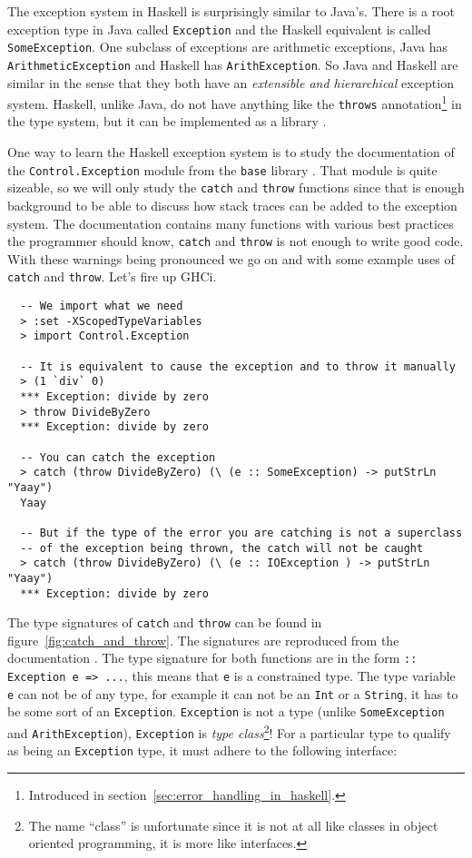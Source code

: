 The exception system in Haskell is surprisingly similar to
Java's.  There is a root exception type in Java called \texttt{Exception}
and the Haskell equivalent is called \texttt{SomeException}. One
subclass of exceptions are arithmetic exceptions, Java has
\texttt{ArithmeticException} and Haskell has \texttt{ArithException}.
So Java and Haskell are similar in the sense that they both have an
\emph{extensible and hierarchical} exception system.  Haskell, unlike
Java, do not have anything like the \texttt{throws}
annotation\footnote{Introduced in section~\ref{sec:error_handling_in_haskell}.}
in the type system, but it can be implemented as a library
\cite{github_pepeiborra_cme, hackage_control_monad_exception}.

One way to learn the Haskell exception system is to study the
documentation of the \texttt{Control.Exception} module from the
\texttt{base} library \cite{hackage_base_control_exception}.
That module is quite sizeable, so
we will only study the \texttt{catch} and \texttt{throw} functions since
that is enough background to be able to discuss how stack traces can be added
to the exception system. The documentation contains many functions with various best practices
the programmer should know, \texttt{catch} and
\texttt{throw} is not enough to write good code. With
these warnings being pronounced we go on and with some example
uses of \texttt{catch} and \texttt{throw}. Let's fire up GHCi.

\begin{verbatim}
  -- We import what we need
  > :set -XScopedTypeVariables
  > import Control.Exception

  -- It is equivalent to cause the exception and to throw it manually
  > (1 `div` 0)
  *** Exception: divide by zero
  > throw DivideByZero
  *** Exception: divide by zero

  -- You can catch the exception
  > catch (throw DivideByZero) (\ (e :: SomeException) -> putStrLn "Yaay")
  Yaay

  -- But if the type of the error you are catching is not a superclass
  -- of the exception being thrown, the catch will not be caught
  > catch (throw DivideByZero) (\ (e :: IOException ) -> putStrLn "Yaay")
  *** Exception: divide by zero
\end{verbatim}

The type signatures of \texttt{catch} and \texttt{throw} can be found in
figure~\ref{fig:catch_and_throw}. The signatures are reproduced from the
documentation \cite{hackage_base_control_exception}. The type signature
for both functions are in the form \texttt{:: Exception e => ...}, this
means that \texttt{e} is a constrained type. The type variable
\texttt{e} can not be of any type, for example it can not be an \texttt{Int} or a
\texttt{String}, it has to be some sort of an \texttt{Exception}.
\texttt{Exception} is not a type (unlike \texttt{SomeException} and
\texttt{ArithException}), \texttt{Exception} is
\emph{type class}\footnote{The name ``class'' is unfortunate since
it is not at all like classes in object oriented programming, it is
more like interfaces.}! For a particular type to qualify as being an
\texttt{Exception} type, it must adhere to the following interface:

